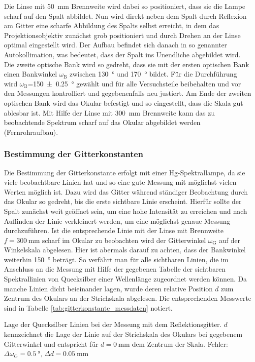 \documentclass[11pt, a4paper]{article}
\numberwithin{equation}{section}
\begin{document}
Die Linse mit \SI{50}{\milli\metre} Brennweite wird dabei so positioniert, dass sie die Lampe scharf auf den Spalt abbildet.
Nun wird direkt neben dem Spalt durch Reflexion am Gitter eine scharfe Abbildung des Spalts selbst erreicht, in dem das Projektionsobjektiv zunächst grob positioniert und durch Drehen an der Linse optimal eingestellt wird.
Der Aufbau befindet sich danach in so genannter Autokollimation, was bedeutet, dass der Spalt ins Unendliche abgebildet wird.
Die zweite optische Bank wird so gedreht, dass sie mit der ersten optischen Bank einen Bankwinkel $\omega_\text{B}$ zwischen \SI{130}{\degree} und \SI{170}{\degree} bildet.
Für die Durchführung wird $\omega_\text{B}$=\SI{150 +- 0.25}{\degree} gewählt und  für alle Versuchsteile beibehalten und vor den Messungen kontrolliert und gegebenenfalls neu justiert.
Am Ende der zweiten optischen Bank wird das Okular befestigt und so eingestellt, dass die Skala gut ablesbar ist.
Mit Hilfe der Linse mit \SI{300}{\milli\metre} Brennweite kann das zu beobachtende Spektrum scharf auf das Okular abgebildet werden (Fernrohraufbau).

\subsubsection{Bestimmung der Gitterkonstanten}
\label{sssec:durchfuehrung_gitterkonstante}
Die Bestimmung der Gitterkonstante erfolgt mit einer Hg-Spektrallampe, da sie viele beobachtbare Linien hat und so eine gute Messung mit möglichst vielen Werten möglich ist.
Dazu wird das Gitter während ständiger Beobachtung durch das Okular so gedreht, bis die erste sichtbare Linie erscheint.
Hierfür sollte der Spalt zunächst weit geöffnet sein, um eine hohe Intensität zu erreichen und nach Auffinden der Linie verkleinert werden, um eine möglichst genaue Messung durchzuführen.
Ist die entsprechende Linie mit der Linse mit Brennweite $f=\SI{300}{\milli\metre}$ scharf im Okular zu beobachten wird der Gitterwinkel $\omega_\text{G}$ auf der Winkelskala abgelesen.
Hier ist abermals darauf zu achten, dass der Bankwinkel weiterhin \SI{150}{\degree} beträgt.
So verfährt man für alle sichtbaren Linien, die im Anschluss an die Messung mit Hilfe der gegebenen Tabelle der sichtbaren Spektrallinien von Quecksilber einer Wellenlänge zugeordnet werden können.
Da manche Linien dicht beieinander lagen, wurde deren relative Position $d$ zum Zentrum des Okulars an der Strichskala abgelesen.
Die entsprechenden Messwerte sind in Tabelle \ref{tab:gitterkonstante_messdaten} notiert.
\begin{table}[h]
	\centering
	
	\caption{Lage der Quecksilber Linien bei der Messung mit dem Reflektionsgitter. $d$ kennzeichnet die Lage der Linie auf der Strichskala des Okulars bei gegebenem Gitterwinkel und entspricht für $d = \SI{0}{\milli\metre}$ dem Zentrum der Skala. Fehler: $\Delta \omega_\mathrm{G} = \SI{0.5}{\degree}$, $\Delta d = \SI{0.05}{\milli\metre}$}
	\label{tab:gitterkonstante_messdaten}
\end{table}
\end{document}
